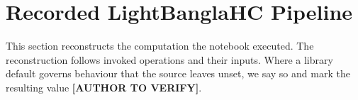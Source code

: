 \documentclass[runningheads]{llncs}
\newcommand{\verifyauthor}{\textbf{[AUTHOR TO VERIFY]}}
\begin{document}



\section{Recorded LightBanglaHC Pipeline}
\label{sec:pipeline}

This section reconstructs the computation the notebook executed. The reconstruction follows invoked operations and their inputs. Where a library default governs behaviour that the source leaves unset, we say so and mark the resulting value \verifyauthor{}.
\end{document}
